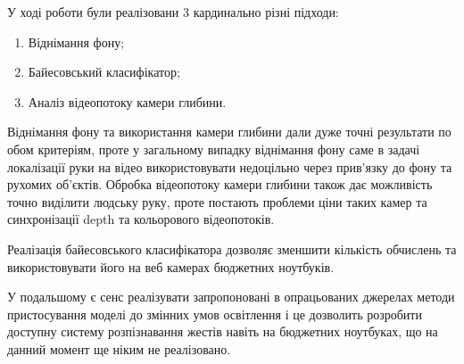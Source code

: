 
У ході роботи були реалізовани 3 кардинально різні підходи:
\begin{enumerate}
	\item Віднімання фону;
	\item Байесовський класифікатор;
	\item Аналіз відеопотоку камери глибини.
\end{enumerate}

Віднімання фону та використання камери глибини дали дуже точні результати по обом критеріям, проте у загальному випадку віднімання фону саме в задачі локалізації руки на відео використовувати недоцільно через прив'язку до фону та рухомих об'єктів. Обробка відеопотоку камери глибини також дає можливість точно виділити людську руку, проте постають проблеми ціни таких камер та синхронізації depth та кольорового відеопотоків.

Реалізація байесовського класифікатора дозволяє зменшити кількість обчислень та використовувати його на веб камерах бюджетних ноутбуків.

У подальшому є сенс реалізувати запропоновані в опрацьованих джерелах методи пристосування моделі до змінних умов освітлення і це дозволить розробити доступну систему розпізнавання жестів навіть на бюджетних ноутбуках, що на данний момент ще ніким не реалізовано.